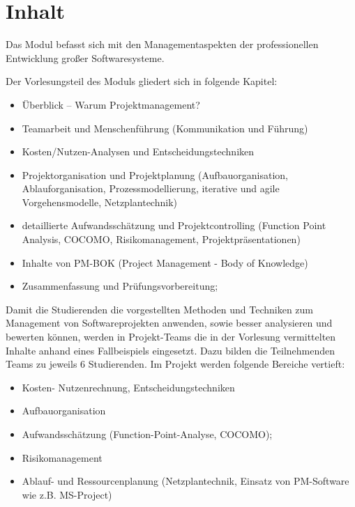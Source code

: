 \section*{Inhalt\label{/mi-2017/modulbeschreibungen-bachelor/BA_Projektmanagement}}\label{inhaltpathlabelmi-2017modulbeschreibungen-bachelorbaux5fprojektmanagement}

Das Modul befasst sich mit den Managementaspekten der professionellen
Entwicklung großer Softwaresysteme.

Der Vorlesungsteil des Moduls gliedert sich in folgende Kapitel:

\begin{itemize}
\tightlist
\item
  Überblick -- Warum Projektmanagement?
\item
  Teamarbeit und Menschenführung (Kommunikation und Führung)
\item
  Kosten/Nutzen-Analysen und Entscheidungstechniken
\item
  Projektorganisation und Projektplanung (Aufbauorganisation,
  Ablauforganisation, Prozessmodellierung, iterative und agile
  Vorgehensmodelle, Netzplantechnik)
\item
  detaillierte Aufwandsschätzung und Projektcontrolling (Function Point
  Analysis, COCOMO, Risikomanagement, Projektpräsentationen)
\item
  Inhalte von PM-BOK (Project Management - Body of Knowledge)
\item
  Zusammenfassung und Prüfungsvorbereitung;
\end{itemize}

Damit die Studierenden die vorgestellten Methoden und Techniken zum
Management von Softwareprojekten anwenden, sowie besser analysieren und
bewerten können, werden in Projekt-Teams die in der Vorlesung
vermittelten Inhalte anhand eines Fallbeispiels eingesetzt. Dazu bilden
die Teilnehmenden Teams zu jeweils 6 Studierenden. Im Projekt werden
folgende Bereiche vertieft:

\begin{itemize}
\tightlist
\item
  Kosten- Nutzenrechnung, Entscheidungstechniken
\item
  Aufbauorganisation
\item
  Aufwandsschätzung (Function-Point-Analyse, COCOMO);
\item
  Risikomanagement
\item
  Ablauf- und Ressourcenplanung (Netzplantechnik, Einsatz von
  PM-Software wie z.B. MS-Project)
\end{itemize}

